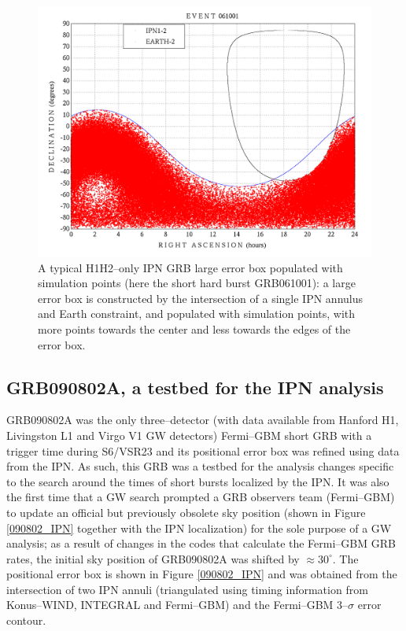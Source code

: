 \begin{figure}[htb]
\begin{center}
\includegraphics[width=28pc]{Images/GRB061001_simulations.png}
\caption{\label{h1h2_ipn_simulations} A typical H1H2--only IPN GRB large error box populated with simulation points (here the short hard burst GRB061001): a large error box is constructed by the intersection of a single IPN annulus and Earth constraint, and populated with simulation points, with more points towards the center and less towards the edges of the error box.}
\end{center}
\end{figure}

\subsection{GRB090802A, a testbed for the IPN analysis}

GRB090802A was the only three--detector (with data available from Hanford H1, Livingston L1 and Virgo V1 GW detectors) Fermi--GBM short GRB with a trigger time during S6/VSR23 and its positional error box was refined using data from the IPN. As such, this GRB was a testbed for the analysis changes specific to the search around the times of short bursts localized by the IPN. It was also the first time that a GW search prompted a GRB observers team (Fermi--GBM) to update an official but previously obsolete sky position (shown in Figure \ref{090802_IPN} together with the IPN localization) for the sole purpose of a GW analysis; as a result of changes in the codes that calculate the Fermi--GBM GRB rates, the initial sky position of GRB090802A was shifted by $\approx30^{\circ}$. The positional error box is shown in Figure \ref{090802_IPN} and was obtained from the intersection of two IPN annuli (triangulated using timing information from Konus--WIND, INTEGRAL and Fermi--GBM) and the Fermi--GBM 3--$\sigma$ error contour.

